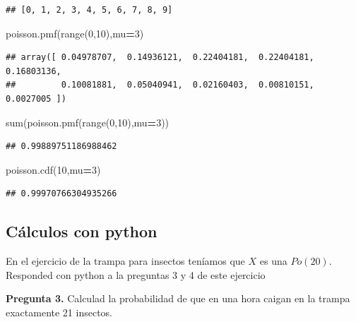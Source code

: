 \documentclass[]{book}
\newenvironment{Shaded}{\begin{snugshade}}{\end{snugshade}}
\newcommand{\BuiltInTok}[1]{#1}
\newcommand{\DecValTok}[1]{\textcolor[rgb]{0.00,0.00,0.81}{#1}}
\newcommand{\NormalTok}[1]{#1}
\newcommand{\OperatorTok}[1]{\textcolor[rgb]{0.81,0.36,0.00}{\textbf{#1}}}
\begin{document}
\begin{verbatim}
## [0, 1, 2, 3, 4, 5, 6, 7, 8, 9]
\end{verbatim}

\begin{Shaded}
\begin{Highlighting}[]
\NormalTok{poisson.pmf(}\BuiltInTok{range}\NormalTok{(}\DecValTok{0}\NormalTok{,}\DecValTok{10}\NormalTok{),mu}\OperatorTok{=}\DecValTok{3}\NormalTok{)}
\end{Highlighting}
\end{Shaded}

\begin{verbatim}
## array([ 0.04978707,  0.14936121,  0.22404181,  0.22404181,  0.16803136,
##         0.10081881,  0.05040941,  0.02160403,  0.00810151,  0.0027005 ])
\end{verbatim}

\begin{Shaded}
\begin{Highlighting}[]
\BuiltInTok{sum}\NormalTok{(poisson.pmf(}\BuiltInTok{range}\NormalTok{(}\DecValTok{0}\NormalTok{,}\DecValTok{10}\NormalTok{),mu}\OperatorTok{=}\DecValTok{3}\NormalTok{))}
\end{Highlighting}
\end{Shaded}

\begin{verbatim}
## 0.99889751186988462
\end{verbatim}

\begin{Shaded}
\begin{Highlighting}[]
\NormalTok{poisson.cdf(}\DecValTok{10}\NormalTok{,mu}\OperatorTok{=}\DecValTok{3}\NormalTok{)}
\end{Highlighting}
\end{Shaded}

\begin{verbatim}
## 0.99970766304935266
\end{verbatim}

\hypertarget{cuxe1lculos-con-python-9}{%
\subsection{Cálculos con python}\label{cuxe1lculos-con-python-9}}

En el ejercicio de la trampa para insectos teníamos que \(X\) es una \(Po(20)\). Responded con python a la preguntas 3 y 4 de este ejercicio

\textbf{Pregunta 3.} Calculad la probabilidad de que en una hora caigan en la trampa exactamente 21 insectos.
\end{document}
